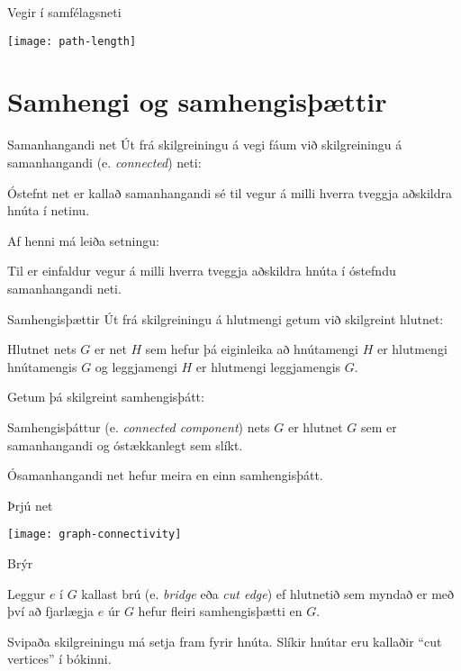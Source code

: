 \documentclass[handout]{beamer}
\begin{document}
\begin{frame}{Vegir í samfélagsneti}
\begin{center}
\texttt{[image: path-length]}
\end{center}
\end{frame}

\section{Samhengi og samhengisþættir}

\begin{frame}{Samanhangandi net}
Út frá skilgreiningu á vegi fáum við skilgreiningu á samanhangandi (e. \emph{connected}) neti:
\begin{tcolorbox}[title=Samanhangandi net]
Óstefnt net er kallað samanhangandi sé til vegur á milli hverra tveggja aðskildra hnúta í netinu.
\end{tcolorbox}
Af henni má leiða setningu:
\begin{tcolorbox}
Til er einfaldur vegur á milli hverra tveggja aðskildra hnúta í óstefndu samanhangandi neti.
\end{tcolorbox}

\end{frame}

\begin{frame}{Samhengisþættir}
Út frá skilgreiningu á hlutmengi getum við skilgreint hlutnet:
\begin{tcolorbox}[title=Hlutnet]
Hlutnet nets $G$ er net $H$ sem hefur þá eiginleika að hnútamengi $H$ er hlutmengi hnútamengis $G$ og leggjamengi $H$ er hlutmengi leggjamengis $G$.
\end{tcolorbox}
\pause
Getum þá skilgreint samhengisþátt:
\begin{tcolorbox}
Samhengisþáttur (e. \emph{connected component}) nets $G$ er hlutnet $G$ sem er samanhangandi og óstækkanlegt sem slíkt.
\end{tcolorbox}
Ósamanhangandi net hefur meira en einn samhengisþátt.
\end{frame}

\begin{frame}{Þrjú net}
\begin{center}
\texttt{[image: graph-connectivity]}
\end{center}
\end{frame}

\begin{frame}{Brýr}
\begin{tcolorbox}[title=Brú]
Leggur $e$ í $G$ kallast brú (e. \emph{bridge} eða \emph{cut edge}) ef hlutnetið sem myndað er með því að fjarlægja $e$ úr $G$ hefur fleiri samhengisþætti en $G$.
\end{tcolorbox}
Svipaða skilgreiningu má setja fram fyrir hnúta. Slíkir hnútar eru kallaðir ``cut vertices'' í bókinni.
\end{frame}
\end{document}
